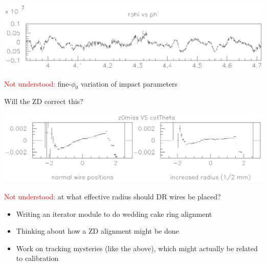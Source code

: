 \documentclass{article}
\begin{document}
\pagebreak

\begin{center}
  \includegraphics*[width=\linewidth]{wiggle2.eps}
\end{center}
\textcolor{red}{Not understood:} fine-$\phi_0$ variation of impact parameters

Will the ZD correct this?

\vspace{1 cm}

\begin{center}
  \includegraphics*[width=\linewidth]{z0miss_problem.eps}
\end{center}
\textcolor{red}{Not understood:} at what effective radius should DR
wires be placed?

\vspace{1 cm}

\hspace{-2 cm}{\Huge \sc What I'm doing:}

\begin{itemize}

  \item Writing an iterator module to do wedding cake ring alignment

  \item Thinking about how a ZD alignment might be done

\end{itemize}

\hspace{-2 cm}{\Huge \sc What Nadia will take over:}

\begin{itemize}

  \item Work on tracking mysteries (like the above), which might
  actually be related to calibration

\end{itemize}
\end{document}
